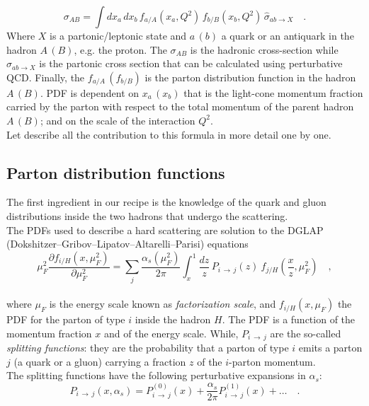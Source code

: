 \begin{equation}
	\sigma_{AB}=\displaystyle\int dx_a\,dx_b\,f_{a/A}(x_a,Q^2)\,f_{b/B}(x_b,Q^2)\,\hat{\sigma}_{ab \rightarrow X}\quad .
\label{eq:factorization2}
\end{equation}
Where $X$ is a partonic/leptonic state and $a\,(b)$ a quark or an antiquark in the hadron $A\,(B)$, e.g. the proton. The $\sigma_{AB}$ is the hadronic cross-section while $\sigma_{ab\rightarrow X}$ is the partonic cross section that can be calculated using perturbative QCD. Finally, the $f_{a/A}\,(f_{b/B})$ is the parton distribution function in the hadron $A\,(B)$. PDF is dependent on $x_a\,(x_b)$ that is the light-cone momentum fraction carried by the parton with respect to the total momentum of the parent hadron $A\,(B)$; and on the scale of the interaction $Q^2$. 
\\
Let describe all the contribution to this formula in more detail one by one.

\subsection{Parton distribution functions}

The first ingredient in our recipe is the knowledge of the quark and gluon distributions inside the two hadrons that undergo the scattering. 
\\
The PDFs used to describe a hard scattering are solution to the DGLAP (Dokshitzer–Gribov–Lipatov–Altarelli–Parisi) equations \cite{Lipatov:400357, Gribov:427157, ALTARELLI1977298, Dokshitzer:1977sg}
\\
\begin{equation}
	\mu_F^2\frac{\partial f_{i/H}(x,\mu_F^2)}{\partial\mu_F^2}=\displaystyle\sum_j\frac{\alpha_s(\mu_F^2)}{2\pi}\displaystyle\int_x^1 \frac{dz}{z}\, P_{i\,\rightarrow\,j}(z)\ f_{j/H}\left(\frac{x}{z},\mu_F^2\right)\quad ,
\end{equation}
\\
where $\mu_F$ is the energy scale known as  \textit{factorization scale}, and $f_{i/H}(x,\mu_F)$ the PDF for the parton of type $i$ inside the hadron $H$. The PDF is a function of the momentum fraction $x$ and of the energy scale.
While, $P_{i\,\rightarrow\,j}$ are the so-called \textit{splitting functions}: they are the probability that a parton of type $i$ emits a parton $j$ (a quark or a gluon) carrying a fraction $z$ of the $i$-parton momentum.
\\
The splitting functions have the following perturbative expansions in $\alpha_s$: 
\begin{equation}
	P_{i\,\rightarrow\,j}(x,\alpha_s)=P_{i\,\rightarrow\,j}^{(0)}(x)+\frac{\alpha_s}{2\pi}P_{i\,\rightarrow\,j}^{(1)}(x)+\dots\quad .
\end{equation}


